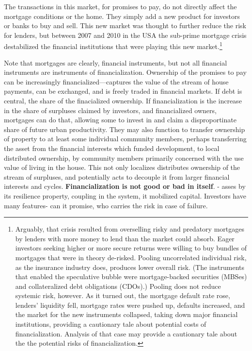 The transactions in this market, for promises to pay, do not directly affect the mortgage conditions or the home. They simply add a new product for investors or banks to buy and sell. This new market was thought to further reduce the risk for lenders, but between 2007 and 2010 in the USA the sub-prime mortgage crisis destabilized the financial institutions that were playing this new market.\footnote{Arguably, that crisis resulted from overselling risky and predatory mortgages by lenders with more money to lend than the market could absorb. Eager investors seeking higher or more secure returns were willing  to buy bundles of  mortgages that were in theory de-risked. Pooling uncorrelated individual risk, as the insurance industry does, produces lower overall risk. (The instruments that enabled the speculative bubble were mortgage-backed securities (MBSes) and collateralized debt obligations (CDOs).) Pooling does not reduce systemic risk, however. As it turned out, the mortgage default rate rose, lenders' liquidity fell, mortgage rates were pushed up, defaults increased, and the market for the new instruments collapsed, taking down major financial institutions, providing a cautionary tale about potential costs of financialization. Analysis of that case may provide a cautionary tale about the the potential risks of financialization.} 

Note that mortgages are clearly, financial instruments, but not all financial instruments are instruments of financialization. Ownership of the promises to pay can be increasingly financialized---captures the value of the stream of house payments, can be exchanged, and is freely traded in financial markets. If debt is central, the share of the finacialized ownership.
If financialization is the increase in the share of surpluses claimed by investors, and financialized owners, mortgages can do that, allowing some to invest in and claim a disproportinate share of future urban productivity. They may also function to transfer ownership of property to at least some individual community members, perhaps transferring the asset from the financial interests which funded development, to local distributed ownership, by community members primarily concerned with the use value of living in the house. This not only localizes distributes ownership of the stream of surpluses, and potentially acts to decouple it from larger financial interests and cycles. 
\textbf{Financialization is not good or bad in itself}. - asses by its resilience property, coupling in the system, it mobilized capital. Investors have many features- can it promise, who carries the risk in case of failure. 

